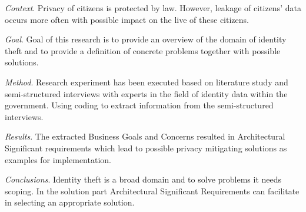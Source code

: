 


\begin{abstracts}        %

\noindent \textit{Context}. 
Privacy of citizens is protected by law. However, leakage of citizens' data occurs more often with possible impact on the live of these citizens.

\noindent \textit{Goal}. 
Goal of this research is to provide an overview of the domain of identity theft and to provide a definition of concrete problems together with possible solutions.

\noindent \textit{Method}. 
Research experiment has been executed based on literature study and semi-structured interviews with experts in the field of identity data within the government. 
Using coding to extract information from the semi-structured interviews.

\noindent \textit{Results}. 
The extracted Business Goals and Concerns resulted in Architectural Significant requirements which lead to possible privacy mitigating solutions as examples for implementation.

\noindent \textit{Conclusions}. 
Identity theft is a broad domain and to solve problems it needs scoping. In the solution part Architectural Significant Requirements can facilitate in selecting an appropriate solution.

\end{abstracts}


